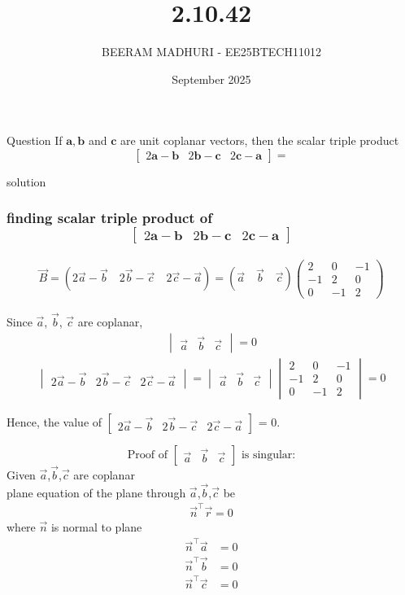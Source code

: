 \documentclass{beamer}
\title %
{2.10.42}
\date{September  2025}
\author %
{BEERAM MADHURI - EE25BTECH11012}
\begin{document}
\frame{\titlepage}
\begin{frame}{Question}
If $\mathbf{a}, \mathbf{b}$ and $\mathbf{c}$ are unit coplanar vectors, then the scalar triple product
\[\begin{bmatrix}2\mathbf{a} - \mathbf{b} & 2\mathbf{b} - \mathbf{c} & 2\mathbf{c} - \mathbf{a}\end{bmatrix} =\]
\end{frame}
  
\begin{frame}{solution}
\frametitle{finding scalar triple product of \[\begin{bmatrix}2\mathbf{a} - \mathbf{b} & 2\mathbf{b} - \mathbf{c} & 2\mathbf{c} - \mathbf{a}\end{bmatrix} \] }
\begin{align}
\vec{B} = (2\vec{a} - \vec{b} \quad 2\vec{b} - \vec{c} \quad 2\vec{c} - \vec{a}) = (\vec{a} \quad \vec{b} \quad \vec{c})\begin{pmatrix}2 & 0 & -1 \\-1 & 2 & 0 \\0 & -1 & 2\end{pmatrix}
\end{align}

Since $\vec{a}$, $\vec{b}$, $\vec{c}$ are coplanar,
\begin{align}
\begin{vmatrix}\vec{a} & \vec{b} & \vec{c}\end{vmatrix} = 0
\end{align}
\begin{align}
    \begin{vmatrix}2\vec{a} - \vec{b} & 2\vec{b} - \vec{c} & 2\vec{c} - \vec{a}\end{vmatrix} = \begin{vmatrix}\vec{a} & \vec{b} & \vec{c}\end{vmatrix} \begin{vmatrix}2 & 0 & -1 \\-1 & 2 & 0 \\0 & -1 & 2\end{vmatrix} =0
\end{align}

Hence, the value of $\begin{bmatrix} 2\vec{a} - \vec{b} & 2\vec{b} - \vec{c} & 2\vec{c} - \vec{a}\end{bmatrix}$ = 0.
\end{frame}
\begin{frame}
\[\text {Proof of } \begin{bmatrix} \vec{a} & \vec{b} & \vec{c} \end{bmatrix} \text{ is singular:}\]
Given $\vec{a}$,$\vec{b}$,$\vec{c}$ are coplanar\\
plane equation of the plane through  $\vec{a}$,$\vec{b}$,$\vec{c}$ be 
\begin{align}
\vec{n}^\top \vec{r} = 0
\end{align}
where $\vec{n}$ is normal to plane
\begin{align}
\vec{n}^\top \Vec{a} &= 0 \\ 
\vec{n}^\top \vec{b} &= 0 \\
\vec{n}^\top \vec{c} &= 0
\end{align}
\end{frame}
\end{document}
